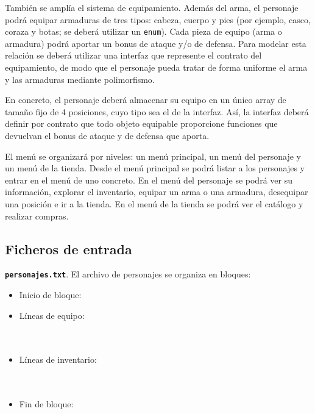 \documentclass[11pt,a4paper]{article}
\begin{document}
También se amplía el sistema de equipamiento. Además del arma, el personaje podrá equipar armaduras de tres tipos: cabeza, cuerpo y pies (por ejemplo, casco, coraza y botas; se deberá utilizar un \texttt{enum}). Cada pieza de equipo (arma o armadura) podrá aportar un bonus de ataque y/o de defensa. Para modelar esta relación se deberá utilizar una interfaz que represente el contrato del equipamiento, de modo que el personaje pueda tratar de forma uniforme el arma y las armaduras mediante polimorfismo.

En concreto, el personaje deberá almacenar su equipo en un único array de tamaño fijo de 4 posiciones, cuyo tipo sea el de la interfaz. Así, la interfaz deberá definir por contrato que todo objeto equipable proporcione funciones que devuelvan el bonus de ataque y de defensa que aporta.

El menú se organizará por niveles: un menú principal, un menú del personaje y un menú de la tienda. Desde el menú principal se podrá listar a los personajes y entrar en el menú de uno concreto. En el menú del personaje se podrá ver su información, explorar el inventario, equipar un arma o una armadura, desequipar una posición e ir a la tienda. En el menú de la tienda se podrá ver el catálogo y realizar compras.


\subsection{Ficheros de entrada}

\textbf{\texttt{personajes.txt}}. El archivo de personajes se organiza en bloques:
\begin{itemize}[noitemsep, topsep=0pt]
    \item Inicio de bloque: 
    \item Líneas de equipo:\\
    \\
    \\
    \item Líneas de inventario:\\
    \\
    \\
    \item Fin de bloque: 
\end{itemize}
\end{document}

